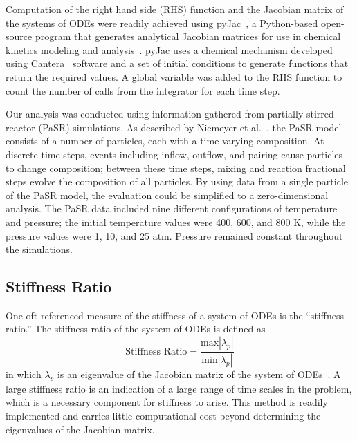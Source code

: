 \documentclass[12pt]{ussci}
\begin{document}
Computation of the right hand side (RHS) function and the Jacobian matrix of the systems of ODEs were readily achieved using pyJac~\cite{pyJac:1.0.2}, a Python-based open-source program that generates analytical Jacobian matrices for use in chemical kinetics modeling and analysis~\cite{Niemeyer:2017}.
pyJac uses a chemical mechanism developed using Cantera~\cite{Goodwin:2015aa} software and a set of initial conditions to generate functions that return the required values.  A global variable was added to the RHS function to count the number of calls from the integrator for each time step.

Our analysis was conducted using information gathered from partially stirred reactor (PaSR) simulations.
As described by Niemeyer et al.~\cite{Niemeyer:2017}, the PaSR model consists of a number of particles, each with a time-varying composition.
At discrete time steps, events including inflow, outflow, and pairing cause particles to change composition; between these time steps, mixing and reaction fractional steps evolve the composition of all particles.
By using data from a single particle of the PaSR model, the evaluation could be simplified to a zero-dimensional analysis.
The PaSR data included nine different configurations of temperature and pressure; the initial temperature values were 400, 600, and 800 K, while the pressure values were 1, 10, and 25 atm.
Pressure remained constant throughout the simulations.



\subsection{Stiffness Ratio}
One oft-referenced measure of the stiffness of a system of ODEs is the ``stiffness ratio.''
The stiffness ratio of the system of ODEs is defined as
\begin{equation}
	\textrm{Stiffness Ratio} = \frac{\textrm{max}|\lambda_p|}{\textrm{min}|\lambda_p|}
\end{equation}	
in which $\lambda_p$ is an eigenvalue of the Jacobian matrix of the system of ODEs~\cite{LeVeque2007}.
A large stiffness ratio is an indication of a large range of time scales in the problem, which is a necessary component for stiffness to arise.
This method is readily implemented and carries little computational cost beyond determining the eigenvalues of the Jacobian matrix.
\end{document}
